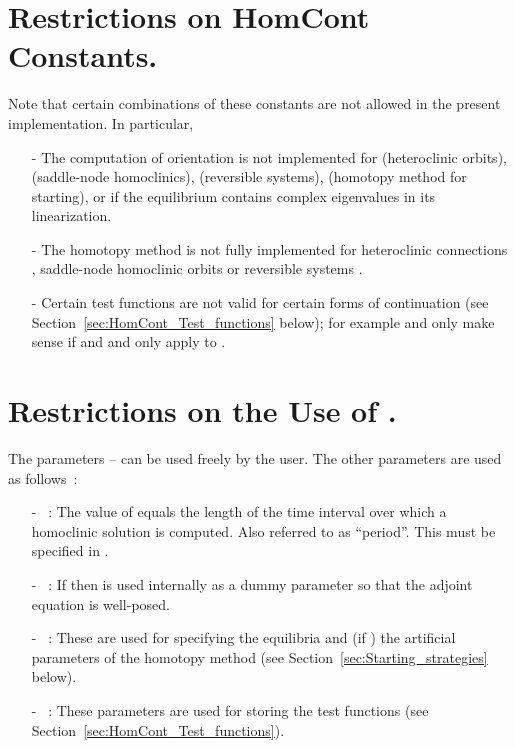 \documentclass[12pt]{report}
\begin{document}
\section{ Restrictions on {\cal HomCont} Constants.}
Note that certain combinations of these constants are not allowed
in the present implementation. In particular,
\begin{itemize}
\item[-] 
The computation of orientation  is not
implemented for  (heteroclinic orbits), 
 (saddle-node homoclinics),
 (reversible systems),  (homotopy
method for starting), or if the equilibrium contains complex
eigenvalues in its linearization.  
\item[-] The homotopy method  is not fully implemented
for heteroclinic connections , saddle-node homoclinic
orbits  or reversible systems .
\item[-] Certain test functions are not valid for certain forms
of continuation 
(see Section~\ref{sec:HomCont_Test_functions} below); 
for example
 and  only make sense if 
 and  and  only apply
to .
\end{itemize}

\section{ Restrictions on the Use of .}
The parameters  --  can be used freely by
the user. The other parameters are used as follows~:

\begin{itemize}

\item[-] ~: 
The value of  equals the length of the time interval over
which a homoclinic solution is computed. Also referred to as ``period''.
This must be specified in .

\item[-] ~: 
If  then  is used internally as a
dummy parameter so that the adjoint equation is well-posed.

\item[-] ~:
These are used for specifying the 
equilibria and (if ) the artificial parameters of
the homotopy method (see Section~\ref{sec:Starting_strategies} below).

\item[-] ~: 
These parameters are used for storing the test functions 
(see Section~\ref{sec:HomCont_Test_functions}).
\end{itemize}
\end{document}
